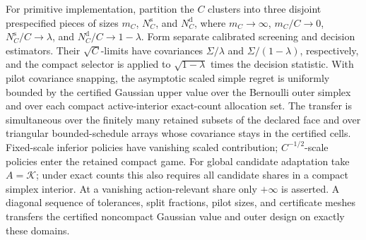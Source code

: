 For primitive implementation, partition the \(C\) clusters into three disjoint prespecified pieces of sizes \(m_C\), \(N_C^{\mathrm s}\), and \(N_C^{\mathrm d}\), where \(m_C\to\infty\), \(m_C/C\to0\), \(N_C^{\mathrm s}/C\to\lambda\), and \(N_C^{\mathrm d}/C\to1-\lambda\).  Form separate calibrated screening and decision estimators.  Their \(\sqrt C\)-limits have covariances \(\Sigma/\lambda\) and \(\Sigma/(1-\lambda)\), respectively, and the compact selector is applied to \(\sqrt{1-\lambda}\) times the decision statistic.  With pilot covariance snapping, the asymptotic scaled simple regret is uniformly bounded by the certified Gaussian upper value over the Bernoulli outer simplex and over each compact active-interior exact-count allocation set.  The transfer is simultaneous over the finitely many retained subsets of the declared face and over triangular bounded-schedule arrays whose covariance stays in the certified cells.  Fixed-scale inferior policies have vanishing scaled contribution; \(C^{-1/2}\)-scale policies enter the retained compact game.  For global candidate adaptation take \(A=\mathcal K\); under exact counts this also requires all candidate shares in a compact simplex interior.  At a vanishing action-relevant share only \(+\infty\) is asserted.  A diagonal sequence of tolerances, split fractions, pilot sizes, and certificate meshes transfers the certified noncompact Gaussian value and outer design on exactly these domains.